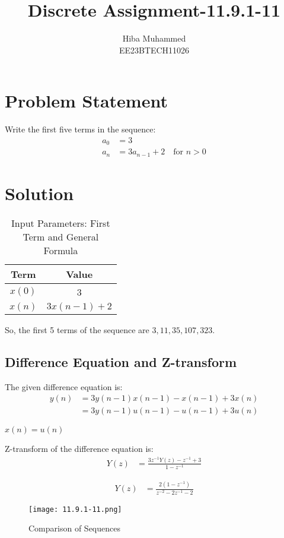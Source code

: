 \documentclass[12pt]{article}
\title{Discrete Assignment-11.9.1-11}
\author{Hiba Muhammed \\
        EE23BTECH11026}
\date{}
\begin{document}
\maketitle

\section*{Problem Statement}
Write the first five terms in the sequence:
\begin{align}
a_{0}  &= 3 \\
a_{n}  &= 3a_{n-1} + 2 \quad \text{for } n > 0
\end{align}

\section*{Solution}
\begin{table}[h]
  \centering
  \caption{Input Parameters: First Term and General Formula}
  \begin{tabular}{|c|c|}
    \hline
    \textbf{Term} & \textbf{Value} \\
    \hline
    \(x(0)\) & 3 \\
    \(x(n)\) & \(3x(n-1) + 2\) \\
    \hline
  \end{tabular}
\end{table}


So, the first 5 terms of the sequence are \(3, 11, 35, 107, 323\).

\subsection*{Difference Equation and Z-transform}

The given difference equation is:
\begin{align}
y(n) &= 3y(n-1)x(n-1) - x(n-1) + 3x(n) \\
     &= 3y(n-1)u(n-1) - u(n-1) + 3u(n)
\end{align}

\textbf{$x(n) = u(n)$}

Z-transform of the difference equation is:
\begin{align}
Y(z) &= \frac{3z^{-1}Y(z) - z^{-1} + 3}{1 - z^{-1}}
\end{align}

\begin{align}
Y(z) &= \frac{2(1 - z^{-1})}{z^{-2} - 2z^{-1} - 2}
\end{align}

\begin{figure}[h]
    \centering
    \texttt{[image: 11.9.1-11.png]}
    \caption{Comparison of Sequences}
    \label{fig:comparison}
\end{figure}
\end{document}
